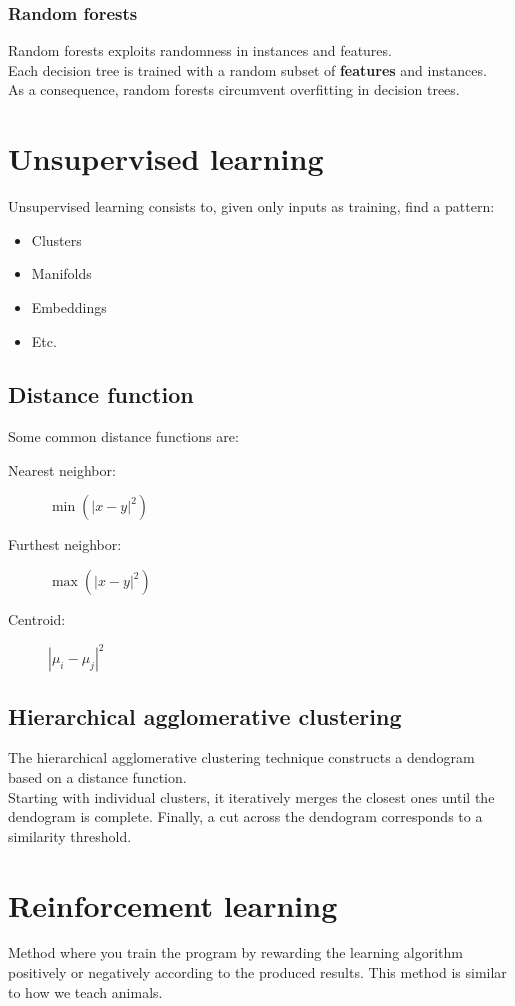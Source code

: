 \documentclass[11pt]{article}
\begin{document}
\subsubsection{Random forests}
\label{sec:org88dc011}
Random forests exploits randomness in instances and features. \\
Each decision tree is trained with a random subset of \textbf{features} and instances. \\
As a consequence, random forests circumvent overfitting in decision trees.
\newpage
\section{Unsupervised learning}
\label{sec:orgbf59b83}
Unsupervised learning consists to, given only inputs as training, find a pattern:
\begin{itemize}[itemsep=0pt]
\item Clusters
\item Manifolds
\item Embeddings
\item Etc.
\end{itemize}
\subsection{Distance function}
\label{sec:org5076090}
Some common distance functions are:
\begin{description}
\item[{Nearest neighbor:}] \(\min({|x - y|}^2)\)
\item[{Furthest neighbor:}] \(\max({|x - y|}^2)\)
\item[{Centroid:}] \({|\mu_i - \mu_j|}^2\)
\end{description}
\subsection{Hierarchical agglomerative clustering}
\label{sec:org5c22a1f}
The hierarchical agglomerative clustering technique constructs a dendogram based on a
distance function. \\
Starting with individual clusters, it iteratively merges the closest ones until the
dendogram is complete. Finally, a cut across the dendogram corresponds to a similarity
threshold.
\section{Reinforcement learning}
\label{sec:orgf3a323c}
Method where you train the program by rewarding the learning algorithm positively or
negatively according to the produced results. This method is similar to how we teach
animals.
\end{document}
